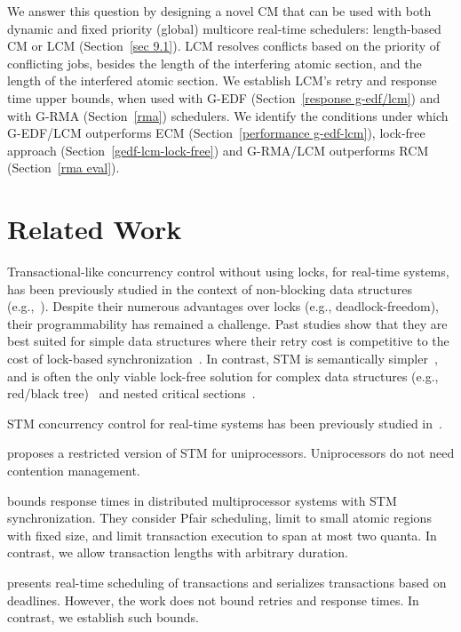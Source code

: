 \documentclass[conference]{IEEEtran}
\begin{document}
We answer this question by designing a novel CM that can be used with both dynamic and fixed priority (global) multicore real-time schedulers: length-based CM or LCM (Section~\ref{sec 9.1}). LCM resolves conflicts based on the priority of conflicting jobs, besides the length of the interfering atomic section, and the length of the interfered atomic section.  We establish LCM's retry and response time upper bounds, when used with G-EDF (Section~\ref{response g-edf/lcm}) and with G-RMA (Section~\ref{rma}) schedulers. We identify the conditions under which G-EDF/LCM outperforms ECM (Section~\ref{performance g-edf-lcm}), lock-free approach (Section~\ref{gedf-lcm-lock-free}) and G-RMA/LCM outperforms RCM (Section~\ref{rma eval}). 

\section{Related Work}
\label{sec:past}

Transactional-like concurrency control without using locks, for real-time systems, has been previously studied in the context of non-blocking data structures (e.g.,~\cite{anderson95realtime}). Despite their numerous advantages over locks 
(e.g., deadlock-freedom), 
their programmability has remained a challenge. 
Past studies show that they are best suited for simple data structures where their retry cost is competitive to the cost of lock-based synchronization~\cite{bc+08}.  In contrast, STM is semantically simpler~\cite{Herlihy:2006:AMP:1146381.1146382}, and is often the only viable lock-free solution for complex data structures (e.g., red/black tree)~\cite{key-1} and nested critical sections~\cite{Saha:2006:MHP:1122971.1123001}.

STM concurrency control for real-time systems has been previously studied in~\cite{manson2006preemptible,fahmy2009bounding,sarni2009real,schoeberl2010rttm,key-1,barrosmanaging,stmconcurrencycontrol:emsoft11}.


\cite{manson2006preemptible} proposes a restricted version of STM for uniprocessors. Uniprocessors do not need contention management.

\cite{fahmy2009bounding} bounds response times in distributed multiprocessor systems with STM synchronization. They consider Pfair scheduling, limit to small atomic regions with fixed size, and limit transaction execution to span at most two quanta. In contrast, we allow transaction lengths 
with  arbitrary duration. 

\cite{sarni2009real} presents real-time scheduling of transactions and serializes transactions based on deadlines. However, the work does not bound retries and response times. In contrast, we establish such bounds.
\end{document}
